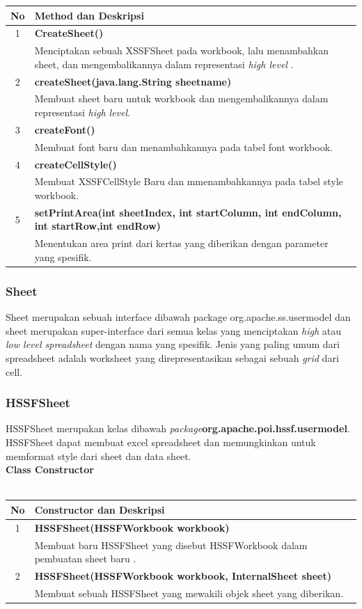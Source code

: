 	\begin{tabular}{|c|p{12cm}|}
		\hline
		\textbf{No} & \textbf{Method dan Deskripsi} \\ \hline \hline
		1 & \textbf{CreateSheet()}\\
			&	Menciptakan sebuah XSSFSheet pada workbook, lalu menambahkan sheet, dan mengembalikannya dalam representasi \textit{high level} .\\ \hline 
		2 & \textbf{createSheet(java.lang.String sheetname)}\\
			&	Membuat sheet baru untuk workbook dan mengembalikannya dalam representasi \textit{high level}.\\ \hline
		3 & \textbf{createFont()}\\
			&	Membuat font baru dan menambahkannya pada tabel font workbook.\\ \hline 
		4 & \textbf{createCellStyle()}\\
			&	Membuat XSSFCellStyle Baru dan mmenambahkannya pada tabel style workbook.\\ \hline
		5 & \textbf{setPrintArea(int sheetIndex, int startColumn, int endColumn, int startRow,int endRow)}\\
			&	Menentukan area print dari kertas yang diberikan dengan parameter yang spesifik.\\ \hline	
	\end{tabular}
	
	
\subsubsection{Sheet}
Sheet merupakan sebuah interface dibawah package org.apache.ss.usermodel dan sheet merupakan super-interface dari semua kelas yang menciptakan \textit{high} atau \textit{low level spreadsheet} dengan nama yang spesifik. Jenis yang paling umum dari spreadsheet adalah worksheet yang direpresentasikan sebagai sebuah \textit{grid} dari cell.\cite{tutpoint}

\subsubsection{HSSFSheet}
HSSFSheet merupakan kelas dibawah \textit{package}\textbf{org.apache.poi.hssf.usermodel}. HSSFSheet dapat membuat excel spreadsheet dan memungkinkan untuk memformat style dari sheet dan data sheet.\cite{tutpoint}
\\
\noindent \textbf{Class Constructor}\\ \\
	\begin{tabular}{|c|p{12cm}|}
		\hline
		\textbf{No} & \textbf{Constructor dan Deskripsi} \\ \hline \hline
		1 & \textbf{HSSFSheet(HSSFWorkbook workbook)}\\
			&	Membuat baru HSSFSheet yang disebut HSSFWorkbook dalam pembuatan sheet baru .\\ \hline 
		2 & \textbf{HSSFSheet(HSSFWorkbook workbook, InternalSheet sheet)}\\
			&	Membuat sebuah HSSFSheet yang mewakili objek sheet yang diberikan.\\ \hline
	\end{tabular}
	

